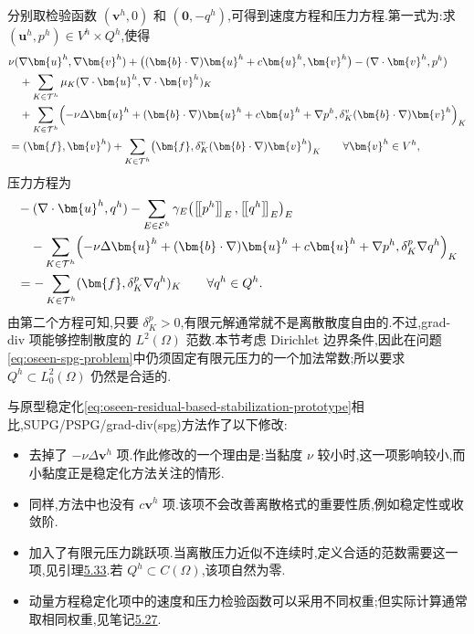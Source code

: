 \begin{note}
分别取检验函数 $(\bm{v}^h,0)$ 和 $(\bm{0},-q^h)$,可得到速度方程和压力方程.第一式为:求 $(\bm{u}^h,p^h)\in V^h\times Q^h$,使得
\[
\begin{aligned}
 &\nu(\nabla\bm{u}^h,\nabla\bm{v}^h)
   +\bigl((\bm{b}\cdot\nabla)\bm{u}^h
        +c\bm{u}^h,\bm{v}^h\bigr)
   -(\nabla\cdot\bm{v}^h,p^h)\\
 &\quad+\sum_{K\in\mathcal{T}^h}
       \mu_K(\nabla\cdot\bm{u}^h,
             \nabla\cdot\bm{v}^h)_K\\
 &\quad+\sum_{K\in\mathcal{T}^h}
       \Bigl(-\nu\Delta\bm{u}^h
          +(\bm{b}\cdot\nabla)\bm{u}^h
          +c\bm{u}^h+\nabla p^h,
          \delta_K^v(\bm{b}\cdot\nabla)\bm{v}^h\Bigr)_K\\
 &=(\bm{f},\bm{v}^h)
   +\sum_{K\in\mathcal{T}^h}
       \bigl(\bm{f},
          \delta_K^v(\bm{b}\cdot\nabla)\bm{v}^h\bigr)_K
  \qquad\forall\bm{v}^h\in V^h,
\end{aligned}
\]
压力方程为
\begin{equation}\label{eq:oseen-spg-pressure-equation}
\begin{aligned}
  &-(\nabla\cdot\bm{u}^h,q^h)
    -\sum_{E\in\mathcal{E}^h}
       \gamma_E\bigl(\left[\!\left[p^h\right]\!\right]_E,
                      \left[\!\left[q^h\right]\!\right]_E\bigr)_E\\
  &\quad-\sum_{K\in\mathcal{T}^h}
       \Bigl(-\nu\Delta\bm{u}^h
          +(\bm{b}\cdot\nabla)\bm{u}^h
          +c\bm{u}^h+\nabla p^h,
          \delta_K^p\nabla q^h\Bigr)_K\\
  &=-\sum_{K\in\mathcal{T}^h}
       (\bm{f},\delta_K^p\nabla q^h)_K
  \qquad\forall q^h\in Q^h.
\end{aligned}
\end{equation}
由第二个方程可知,只要 $\delta_K^p>0$,有限元解通常就不是离散散度自由的.不过,grad-div 项能够控制散度的 $L^2(\Omega)$ 范数.本节考虑 Dirichlet 边界条件,因此在问题\cref{eq:oseen-spg-problem}中仍须固定有限元压力的一个加法常数;所以要求 $Q^h\subset L_0^2(\Omega)$ 仍然是合适的.
\end{note}

\begin{note}\label{note:oseen-spg-prototype-comparison}
与原型稳定化\cref{eq:oseen-residual-based-stabilization-prototype}相比,SUPG/PSPG/grad-div(spg)方法作了以下修改:
\begin{itemize}
  \item 去掉了 $-\nu\Delta\bm{v}^h$ 项.作此修改的一个理由是:当黏度 $\nu$ 较小时,这一项影响较小,而小黏度正是稳定化方法关注的情形.
  \item 同样,方法中也没有 $c\bm{v}^h$ 项.该项不会改善离散格式的重要性质,例如稳定性或收敛阶.
  \item 加入了有限元压力跳跃项.当离散压力近似不连续时,定义合适的范数需要这一项,见引理\hyperref[lem:oseen-spg-norm]{5.33}.若 $Q^h\subset C(\Omega)$,该项自然为零.
  \item 动量方程稳定化项中的速度和压力检验函数可以采用不同权重;但实际计算通常取相同权重,见笔记\hyperref[note:oseen-spg-parameters]{5.27}.
\end{itemize}
\end{note}

